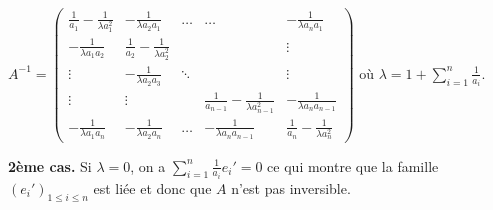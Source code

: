 {{\begin{center}
$A^{-1}=\left(
\begin{array}{ccccc}
\frac{1}{a_1}-\frac{1}{\lambda a_1^2}&-\frac{1}{\lambda a_2a_1}&\ldots&\ldots&-\frac{1}{\lambda a_na_1}\\
-\frac{1}{\lambda a_1a_2}&\frac{1}{a_2}-\frac{1}{\lambda a_2^2}& & &\vdots\\
\vdots&-\frac{1}{\lambda a_2a_3}&\ddots& &\vdots\\
\vdots&\vdots& &\frac{1}{a_{n-1}}-\frac{1}{\lambda a_{n-1}^2}&-\frac{1}{\lambda a_na_{n-1}}\\
-\frac{1}{\lambda a_1a_n}&-\frac{1}{\lambda a_2a_n}&\ldots&-\frac{1}{\lambda a_na_{n-1}}&\frac{1}{a_n}-\frac{1}{\lambda a_n^2}
\end{array}
\right)$  où $\lambda=1+\sum_{i=1}^{n}\frac{1}{a_i}$.
\end{center}

\textbf{2ème cas.} Si $\lambda=0$, on a $\sum_{i=1}^{n}\frac{1}{a_i}e_i'=0$ ce qui montre que la famille $(e_i')_{1\leqslant i\leqslant n}$ est liée et donc que $A$ n'est pas inversible.
}
}
